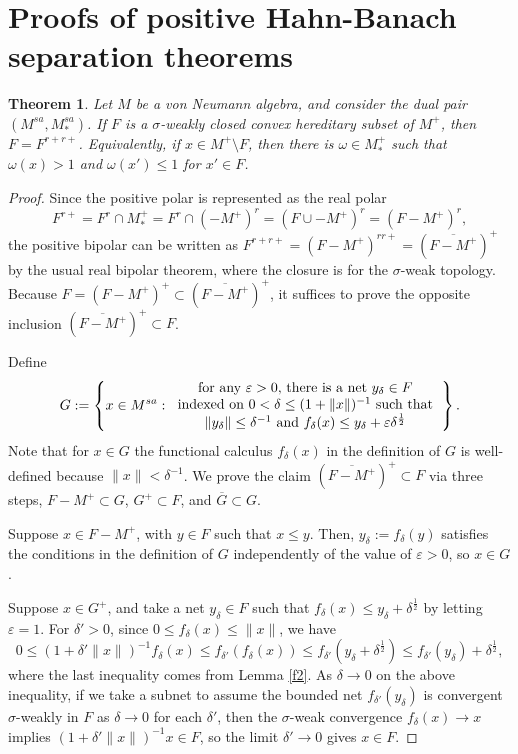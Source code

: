 \documentclass[noamsfonts,a4paper,10pt]{amsart}
\theoremstyle{plain}
\newtheorem{thm}{Theorem}[section]
\theoremstyle{definition}
\theoremstyle{remark}
\begin{document}
\section{Proofs of positive Hahn-Banach separation theorems}



\begin{thm}\label{1}
Let $M$ be a von Neumann algebra, and consider the dual pair $(M^{sa},M_*^{sa})$.
If $F$ is a $\sigma$-weakly closed convex hereditary subset of $M^+$, then $F=F^{r+r+}$.
Equivalently, if $x\in M^+\setminus F$, then there is $\omega\in M_*^+$ such that $\omega(x)>1$ and $\omega(x')\le1$ for $x'\in F$.
\end{thm}
\begin{proof}
Since the positive polar is represented as the real polar
\[F^{r+}=F^r\cap M_*^+=F^r\cap(-M^+)^r=(F\cup-M^+)^r=(F-M^+)^r,\]
the positive bipolar can be written as $F^{r+r+}=(F-M^+)^{rr+}=(\overline{F-M^+})^+$ by the usual real bipolar theorem, where the closure is for the $\sigma$-weak topology.
Because $F=(F-M^+)^+\subset(\overline{F-M^+})^+$, it suffices to prove the opposite inclusion $(\overline{F-M^+})^+\subset F$.

Define
\[G:=\left\{x\in M^{sa}:\begin{tabular}{c}
for any $\varepsilon>0$, there is a net $y_\delta\in F$\\
indexed on $0<\delta\le(1+\|x\|)^{-1}$ such that\\
$\|y_\delta\|\le\delta^{-1}$ and $f_\delta(x)\le y_\delta+\varepsilon\delta^{\frac12}$
\end{tabular}\right\}.\]
Note that for $x\in G$ the functional calculus $f_\delta(x)$ in the definition of $G$ is well-defined because $\|x\|<\delta^{-1}$.
We prove the claim $(\overline{F-M^+})^+\subset F$ via three steps, $F-M^+\subset G$, $G^+\subset F$, and $\overline G\subset G$.

Suppose $x\in F-M^+$, with $y\in F$ such that $x\le y$.
Then, $y_\delta:=f_\delta(y)$ satisfies the conditions in the definition of $G$ independently of the value of $\varepsilon>0$, so $x\in G$.

Suppose $x\in G^+$, and take a net $y_\delta\in F$ such that $f_\delta(x)\le y_\delta+\delta^{\frac12}$ by letting $\varepsilon=1$.
For $\delta'>0$, since $0\le f_\delta(x)\le\|x\|$, we have
\[0\le(1+\delta'\|x\|)^{-1}f_\delta(x)\le f_{\delta'}(f_\delta(x))\le f_{\delta'}(y_\delta+\delta^{\frac12})\le f_{\delta'}(y_\delta)+\delta^{\frac12},\]
where the last inequality comes from Lemma \ref{f2}.
As $\delta\to0$ on the above inequality, if we take a subnet to assume the bounded net $f_{\delta'}(y_\delta)$ is convergent $\sigma$-weakly in $F$ as $\delta\to0$ for each $\delta'$, then the $\sigma$-weak convergence $f_\delta(x)\to x$ implies $(1+\delta'\|x\|)^{-1}x\in F$, so the limit $\delta'\to0$ gives $x\in F$.


\end{proof}
\end{document}
